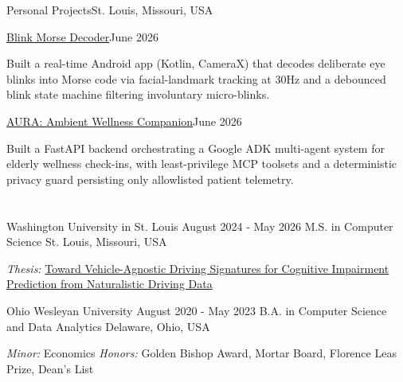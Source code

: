\documentclass[10pt, letterpaper]{article}
\begin{document}
\vspace{\entrySpacing}
\begin{leadershipentry}{Personal Projects}{St. Louis, Missouri, USA}
	\begin{positionentry}{\href{https://github.com/agopalareddy/blink-morse-app}{Blink Morse Decoder}}{June 2026}
		\item Built a real-time Android app (Kotlin, CameraX) that decodes deliberate eye blinks into Morse code via facial-landmark tracking at 30Hz and a debounced blink state machine filtering involuntary micro-blinks.
	\end{positionentry}
	\begin{positionentry}{\href{https://github.com/agopalareddy/wellness-companion}{AURA: Ambient Wellness Companion}}{June 2026}
		\item Built a FastAPI backend orchestrating a Google ADK multi-agent system for elderly wellness check-ins, with least-privilege MCP toolsets and a deterministic privacy guard persisting only allowlisted patient telemetry.
	\end{positionentry}
\end{leadershipentry}

\vspace{\headerSpacing}


\section{}

\vspace{\entrySpacing}
\begin{educationentry}
	{Washington University in St. Louis}
	{August 2024 - May 2026}
	{M.S. in Computer Science}
	{St. Louis, Missouri, USA}
\begin{highlightsforbulletentries}
\item \textit{Thesis:} \href{https://doi.org/10.7936/g95n-fv35}{Toward Vehicle-Agnostic Driving Signatures for Cognitive Impairment Prediction from Naturalistic Driving Data}
\end{highlightsforbulletentries}
\end{educationentry}

\vspace{\entrySpacing}
\begin{educationentry}
	{Ohio Wesleyan University}
	{August 2020 - May 2023}
	{B.A. in Computer Science and Data Analytics}
	{Delaware, Ohio, USA}
\begin{highlightsforbulletentries}
\item \textit{Minor:} Economics \textbar{} \textit{Honors:} Golden Bishop Award, Mortar Board, Florence Leas Prize, Dean's List
\end{highlightsforbulletentries}
\end{educationentry}
\end{document}
